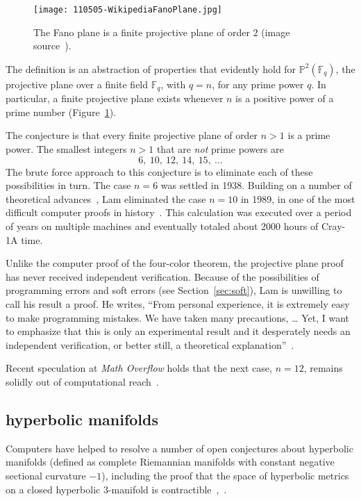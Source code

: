 \documentclass{llncs}
\newcommand{\ring}[1]{\mathbb{#1}}
\begin{document}
\begin{figure}[h!]
  \centering
\texttt{[image: 110505-WikipediaFanoPlane.jpg]}
\caption{The Fano plane is a finite projective plane of order $2$
  (image source~\cite{fano}).}
\label{fig:P2}
\end{figure}

The definition is an abstraction of properties that evidently hold for
$\ring{P}^2(\ring{F}_q)$, the projective plane over a finite field
$\ring{F}_q$, with $q=n$, for any prime power $q$.  In particular, a
finite projective plane exists whenever $n$ is a positive power of a
prime number (Figure~\ref{fig:P2}).

The conjecture is that every finite projective plane
of order $n>1$ is a prime power.  The smallest integers $n>1$
that are {\it not} prime powers are
\[
6,~10,~12,~14,~15,~\dots
\]
The brute force approach to this conjecture is to eliminate each of
these possibilities in turn.  The case $n=6$ was settled in 1938.
Building on a number of theoretical advances~\cite{MST}, Lam
eliminated the case $n=10$ in 1989, in one of the most difficult
computer proofs in history~\cite{Lam89}.  This calculation was
executed over a period of years on multiple machines and eventually
totaled about 2000 hours of Cray-1A time.

Unlike the computer proof of the four-color theorem, the
projective plane proof has never received independent verification.
Because of the possibilities of programming errors and soft errors
(see Section~\ref{sec:soft}), Lam is unwilling to call his result a
proof.  He writes, ``From personal experience, it is extremely easy to
make programming mistakes. We have taken many precautions, 
\dots
Yet, I want to emphasize that this is only an
experimental result and it desperately needs an independent
verification, or better still, a theoretical
explanation''~\cite{LamS}.


Recent speculation at {\it Math Overflow} holds that the next case,
$n=12$, remains solidly out of computational reach~\cite{Horn}.


\subsection{hyperbolic manifolds}

Computers have helped to resolve a number of open conjectures about
hyperbolic manifolds (defined as complete Riemannian manifolds with
constant negative sectional curvature $-1$), including the proof that
the space of hyperbolic metrics on a closed hyperbolic $3$-manifold is
contractible~\cite{GMT},~\cite{GabICM}.
\end{document}
